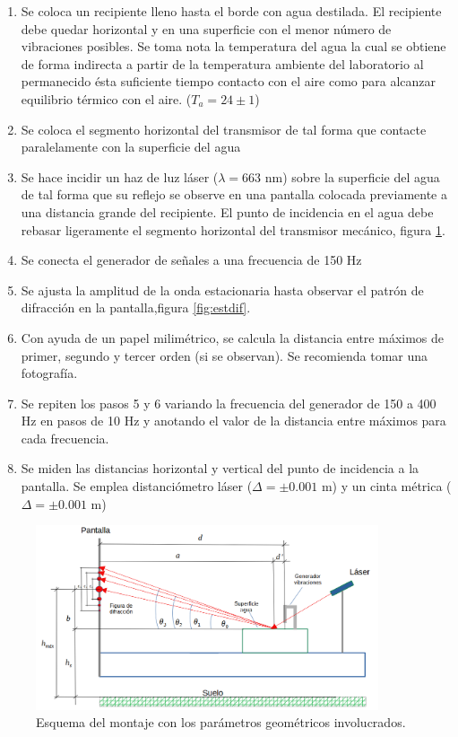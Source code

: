 \begin{enumerate}
	\item Se coloca un recipiente lleno hasta el borde con agua destilada. El recipiente debe quedar horizontal y en una superficie con el menor número de vibraciones posibles. Se toma nota  la temperatura del agua la cual se obtiene de forma indirecta  a partir de la temperatura ambiente del laboratorio al permanecido ésta suficiente tiempo  contacto con el aire como para alcanzar equilibrio térmico con el aire. ($T_a=24\pm1$)
	\item Se coloca el segmento horizontal del transmisor de tal forma que contacte paralelamente con la superficie del agua
	\item Se hace incidir un haz de luz láser ($\lambda=663$ nm) sobre la superficie del agua de tal forma que su reflejo se observe en una pantalla colocada previamente a una distancia grande del recipiente. El punto de incidencia en el agua debe rebasar ligeramente el segmento horizontal del transmisor mecánico, figura \ref{fig:esquema}.
	\item Se conecta el generador de señales a una frecuencia de 150 Hz
	\item Se ajusta la amplitud de la onda estacionaria hasta observar el patrón de difracción en la pantalla,figura \ref{fig:estdif}.
	\item Con ayuda de un papel milimétrico, se calcula la distancia entre máximos de primer, segundo y tercer orden (si se observan). Se recomienda tomar una fotografía. 
	\item Se repiten los pasos 5 y 6 variando la frecuencia del generador de 150 a 400 Hz en pasos de 10 Hz y anotando el valor de la distancia entre máximos para cada frecuencia.
	\item Se miden las distancias horizontal y vertical del punto de incidencia a la pantalla. Se emplea distanciómetro láser ($\Delta = \pm0.001$ m) y un cinta métrica ($\Delta=\pm0.001$ m)
\end{enumerate}


\begin{figure}[H]
	\centering
	\begin{minipage}{0.95\textwidth} 
		\includegraphics[width=0.9\textwidth]{grafico_02x01_esquema_montaje.png}
	\end{minipage}
	\caption{ \footnotesize Esquema del montaje con los parámetros geométricos involucrados.}
	\label{fig:esquema}
\end{figure}



